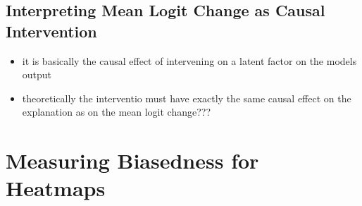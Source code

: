 \subsection{Interpreting Mean Logit Change as Causal Intervention}
\begin{itemize}
    \item it is basically the causal effect of intervening on a latent factor on the models output
    \item theoretically the interventio must have exactly the same causal effect on the explanation as on the mean logit change??? 
\end{itemize}

\section{Measuring Biasedness for Heatmaps}
